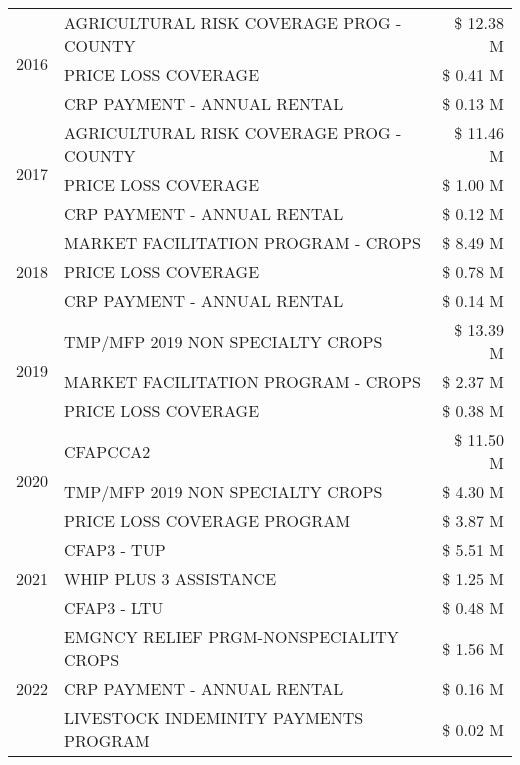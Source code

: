 \begin{tabular}{llr}
\cline{1-3}
\multirow[t]{3}{*}{2016} & AGRICULTURAL RISK COVERAGE PROG - COUNTY & \$ 12.38 M \\
 & PRICE LOSS COVERAGE & \$ 0.41 M \\
 & CRP PAYMENT - ANNUAL RENTAL & \$ 0.13 M \\
\cline{1-3}
\multirow[t]{3}{*}{2017} & AGRICULTURAL RISK COVERAGE PROG - COUNTY & \$ 11.46 M \\
 & PRICE LOSS COVERAGE & \$ 1.00 M \\
 & CRP PAYMENT - ANNUAL RENTAL & \$ 0.12 M \\
\cline{1-3}
\multirow[t]{3}{*}{2018} & MARKET FACILITATION PROGRAM - CROPS & \$ 8.49 M \\
 & PRICE LOSS COVERAGE & \$ 0.78 M \\
 & CRP PAYMENT - ANNUAL RENTAL & \$ 0.14 M \\
\cline{1-3}
\multirow[t]{3}{*}{2019} & TMP/MFP 2019 NON SPECIALTY CROPS & \$ 13.39 M \\
 & MARKET FACILITATION PROGRAM - CROPS & \$ 2.37 M \\
 & PRICE LOSS COVERAGE & \$ 0.38 M \\
\cline{1-3}
\multirow[t]{3}{*}{2020} & CFAPCCA2 & \$ 11.50 M \\
 & TMP/MFP 2019 NON SPECIALTY CROPS & \$ 4.30 M \\
 & PRICE LOSS COVERAGE PROGRAM & \$ 3.87 M \\
\cline{1-3}
\multirow[t]{3}{*}{2021} & CFAP3 - TUP & \$ 5.51 M \\
 & WHIP PLUS 3 ASSISTANCE & \$ 1.25 M \\
 & CFAP3 - LTU & \$ 0.48 M \\
\cline{1-3}
\multirow[t]{3}{*}{2022} & EMGNCY RELIEF PRGM-NONSPECIALITY CROPS & \$ 1.56 M \\
 & CRP PAYMENT - ANNUAL RENTAL & \$ 0.16 M \\
 & LIVESTOCK INDEMINITY PAYMENTS PROGRAM & \$ 0.02 M \\
\cline{1-3}
\bottomrule
\end{tabular}
